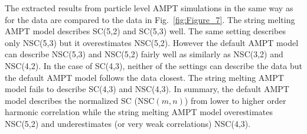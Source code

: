 \documentclass[ALICE,manyauthors]{cernphprep}
\begin{document}
The extracted results  from particle level AMPT simulations in the same way as for the data are compared to the data in Fig.~\ref{fig:Figure_7}.
The string melting AMPT model describes SC(5,2) and SC(5,3) well. The same setting describes only NSC(5,3) but it overestimates NSC(5,2). 
However the default AMPT model can describe NSC(5,3) and NSC(5,2) fairly well as similarly as NSC(3,2) and NSC(4,2).
In the case of SC(4,3), neither of the settings can describe the data but the default AMPT model follows the data closest. 
The string melting AMPT model fails to describe SC(4,3) and NSC(4,3).
In summary, the default AMPT model describes the normalized SC (NSC$(m,n)$) from lower to higher order harmonic correlation while the string melting AMPT model overestimates NSC(5,2) and 
underestimates (or very weak correlations) NSC(4,3). 

\end{document}
